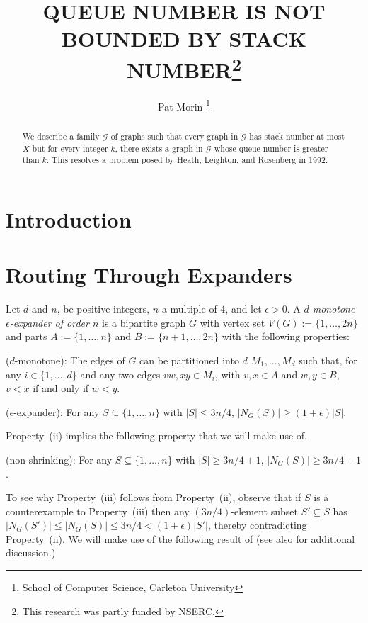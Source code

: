 \documentclass{patmorin}
\title{\MakeUppercase{Queue number is not bounded by stack number}\thanks{This research was partly funded by NSERC.}}
\author{Pat Morin%
    \thanks{School of Computer Science, Carleton University}}
\date{}
\begin{document}
\maketitle

\begin{abstract}
    We describe a family $\mathcal{G}$ of graphs such that every graph in $\mathcal{G}$ has stack number at most $X$ but for every integer $k$, there exists a graph in $\mathcal{G}$ whose queue number is greater than $k$.  This resolves a problem posed by Heath, Leighton, and Rosenberg in 1992.
\end{abstract}

%



\section{Introduction}



\section{Routing Through Expanders}
\label{expander_construction}

Let $d$ and $n$, be positive integers, $n$ a multiple of $4$, and let $\epsilon>0$. A  \emph{$d$-monotone $\epsilon$-expander of order $n$} is a bipartite graph $G$ with vertex set $V(G):=\{1,\ldots,2n\}$ and parts $A:=\{1,\ldots,n\}$ and $B:=\{n+1,\ldots,2n\}$ with the following properties:
\begin{compactenum}[(i)]
  \item ($d$-monotone): The edges of $G$ can be partitioned into $d$ $M_1,\ldots,M_d$ such that, for any $i\in\{1,\ldots,d\}$ and any two edges $vw,xy\in M_i$, with $v,x\in A$ and $w,y\in B$, $v < x$ if and only if $w < y$.
  \item ($\epsilon$-expander): For any $S\subseteq\{1,\ldots,n\}$ with $|S|\le 3n/4$, $|N_G(S)|\ge (1+\epsilon)|S|$.
\end{compactenum}

Property~(ii) implies the following property that we will make use of.
\begin{compactenum}[(i)]\setcounter{enumi}{2}
  \item (non-shrinking): For any $S\subseteq\{1,\ldots,n\}$ with $|S|\ge 3n/4+1$, $|N_G(S)|\ge 3n/4+1$.
\end{compactenum}
To see why Property~(iii) follows from Property~(ii), observe that if $S$ is a counterexample to Property~(iii) then any $(3n/4)$-element subset $S'\subseteq S$ has $|N_G(S')|\le |N_G(S)| \le 3n/4 < (1+\epsilon)|S'|$, thereby contradicting Property~(ii).  We will make use of the following result of \cite{bourgain:X,bourgain.yehudahoff:X} (see also \citet{XX} for additional discussion.)
\end{document}
